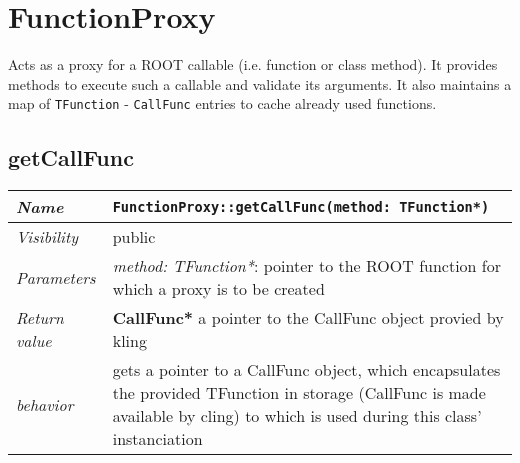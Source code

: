 \chapter{FunctionProxy}
	Acts as a proxy for a ROOT callable (i.e. function or class method). It provides methods to execute such a callable and validate its arguments. It also maintains a map of \texttt{TFunction} - \texttt{CallFunc} entries to cache already used functions.

\section{getCallFunc}
\begin{longtable}{p{3cm} @{\hskip 1cm} p{12cm}}
	\hline

	\textit{Name} & \texttt{FunctionProxy::getCallFunc(method: TFunction*)}\\
	\hline

	\textit{Visibility} & public\\
	\hline

	\textit{Parameters} &  \textit{method: TFunction*}: pointer to the ROOT function for which a proxy 
							is to be created\\
	\hline

	\textit{Return value} & \textbf{CallFunc*} a pointer to the CallFunc object provied by kling\\
	\hline

	\textit{behavior} & gets a pointer to a CallFunc object, which encapsulates the provided TFunction 
			in storage (CallFunc is made available by cling)  to which is used during this class' instanciation\\
	\hline

\end{longtable} \pagebreak

